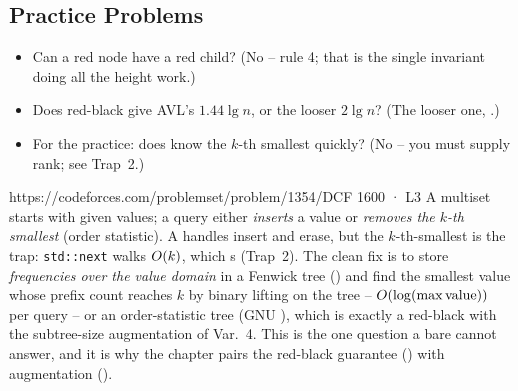 \subsection{Practice Problems}

\begin{stuckbox}
\begin{itemize}[nosep, leftmargin=1.4em]
  \item Can a red node have a red child? (No -- rule 4; that is the single invariant doing all the height
        work.)
  \item Does red-black give AVL's $1.44\lg n$, or the looser $2\lg n$? (The looser one,
        .)
  \item For the practice: does  know the $k$-th smallest quickly? (No -- you must supply rank;
        see Trap~2.)
\end{itemize}
\end{stuckbox}

\begin{practiceset}
    {https://codeforces.com/problemset/problem/1354/D}{CF 1600 · L3}
    {A multiset starts with given values; a query either \emph{inserts} a value or \emph{removes the
    $k$-th smallest} (order statistic). A  handles insert and erase, but the
    $k$-th-smallest is the trap: \texttt{std::next} walks $O(k)$, which \tle s (Trap~2). The clean
    fix is to store \emph{frequencies over the value domain} in a Fenwick tree
    () and find the smallest value whose prefix count reaches $k$ by binary lifting on the tree
    -- $O(\log(\max\text{value}))$ per query -- or an order-statistic tree (GNU ), which is
    exactly a red-black  with the subtree-size augmentation of Var.~4. This is the one question a
    bare  cannot answer, and it is why the chapter pairs the red-black guarantee
    () with augmentation ().}
\end{practiceset}

